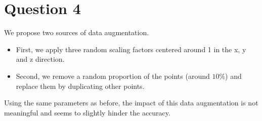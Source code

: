 \documentclass[a4paper]{article}
\begin{document}
\section*{Question 4}
We propose two sources of data augmentation. 
\begin{itemize}
    \item First, we apply three random scaling factors centered around 1 in the x, y and z direction. 
    \item Second, we remove a random proportion of the points (around $10\%$) and replace them by duplicating other points.
\end{itemize}
Using the same parameters as before, the impact of this data augmentation is not meaningful and seems to slightly hinder the accuracy.
\end{document}
